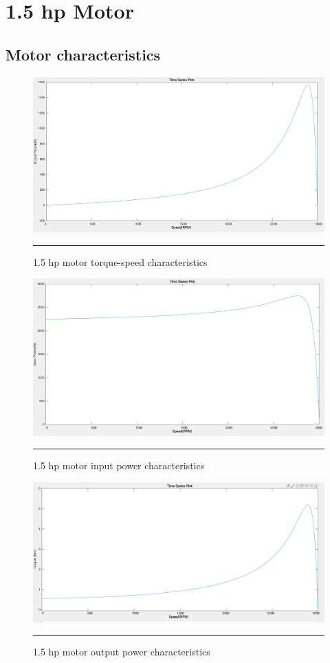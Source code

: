 \section{1.5 hp Motor}
\subsection{Motor characteristics}

\begin{figure}[htbp]
	\centering
		\includegraphics[width = 4.5in]{./Figures/MS/fig512.png}
		\rule{35em}{0.5pt}
	\caption{1.5 hp motor torque-speed characteristics}
	\label{fig:1.5 hp motor torque-speed characteristics} 
\end{figure}

\begin{figure}[htbp]
	\centering
		\includegraphics[width = 4.5in]{./Figures/MS/fig513.png}
		\rule{35em}{0.5pt}
	\caption{1.5 hp motor input power characteristics}
	\label{fig:1.5 hp motor input power characteristics} 
\end{figure}

\begin{figure}[htbp]
	\centering
		\includegraphics[width = 4.5in]{./Figures/MS/fig514.png}
		\rule{35em}{0.5pt}
	\caption{1.5 hp motor output power characteristics}
	\label{fig:1.5 hp motor output power characteristics} 
\end{figure}

